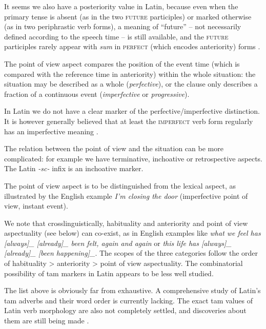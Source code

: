 \documentclass[a4paper, oneside, 12pt]{report}
\newcommand*{\citetable}[1]{Table~{#1}}
\newcommand*{\citepage}[1]{p.~{#1}}
\newcommand*{\term}[1]{\emph{#1}}
\newcommand{\form}[1]{\emph{#1}}
\newcommand*{\category}[1]{\textsc{#1}}
\begin{document}
It seems we also have a posteriority value in Latin,
because even when the primary tense is absent 
(as in the two \category{future} participles)
or marked otherwise (as in two periphrastic verb forms),
a meaning of ``future'' -- not necessarily defined according to the speech time --
is still available,
and the \category{future} participles rarely appear
with \form{sum} in \category{perfect} (which encodes anteriority) forms
\citep[\citetable{7.3}]{Pinkster1}.

The point of view aspect compares the position of the event time
(which is compared with the reference time in anteriority)
within the whole situation:
the situation may be described as a whole (\term{perfective}),
or the clause only describes a fraction of a continuous event 
(\term{imperfective} or \term{progressive}).

In Latin we do not have a clear marker of the perfective/imperfective distinction.
It is however generally believed that at least the \category{imperfect} verb form regularly has an imperfective meaning \citep[\citepage{380}]{Pinkster1}.

The relation between the point of view and the situation can be more complicated:
for example we have terminative, inchoative or retrospective aspects.
The Latin \form{-sc-} infix is an inchoative marker.

The point of view aspect is to be distinguished from the lexical aspect,
as illustrated by the English example \form{I'm closing the door}
(imperfective point of view, instant event).

We note that crosslinguistically, 
habituality and anteriority and point of view aspectuality (see below) can co-exist,
as in English examples like \form{what we feel has [always]_{} [already]_{} been felt, again and again} or 
\form{this life has [always]_{} [already]_{\text{anteriority}} [been happening]_{\text{progressive}}}.
The scopes of the three categories follow
the order of habituality \textgreater{} anteriority \textgreater{} point of view aspectuality.
The combinatorial possibility of \ac{tam} markers in Latin appears to be less well studied.


The list above is obviously far from exhaustive.
A comprehensive study of Latin's \ac{tam} adverbs and their word order is currently lacking.
The exact \ac{tam} values of Latin verb morphology are also not completely settled, and discoveries about them are still being made \citep{dyck2017oxford}.
\end{document}
